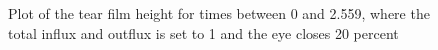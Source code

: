 \begin{figure}

	\caption{Plot of the tear film height for times between 0 and 2.559, where the total influx and outflux is set to 1 and the eye closes 20 percent}
	\label{tears_021}
\end{figure}

